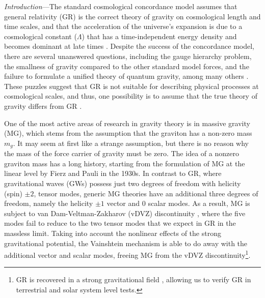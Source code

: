 \documentclass[10pt,prd,twocolumn,aps,nofootinbib,nobibnotes,superscriptaddress,preprintnumbers]{revtex4-2}
\begin{document}
\textit{Introduction}---The standard cosmological concordance model assumes that general relativity (GR) is the correct theory of gravity on cosmological length and time scales, and that the acceleration of the universe's expansion is due to a cosmological constant ($\Lambda$) that has a time-independent energy density and becomes dominant at late times \cite{Dodelson:2020bqr}. 
Despite the success of the concordance model, there are several unanswered questions, including the gauge hierarchy problem, the smallness of gravity compared to the other standard model forces, and the failure to formulate a unified theory of quantum gravity, among many others \cite{Dvali:2013qwe, Moffat:1998vi}. 
These puzzles suggest that GR is not suitable for describing physical processes at cosmological scales, and thus, one possibility is to assume that the true theory of gravity differs from GR \cite{deRham:2023byw}. 

One of the most active areas of research in gravity theory is in massive gravity (MG), which stems from the assumption that the graviton has a non-zero mass $m_g$. It may seem at first like a strange assumption, but there is no reason why the mass of the force carrier of gravity must be zero. The idea of a nonzero graviton mass has a long history, starting from the formulation of MG at the linear level by Fierz and Pauli \cite{Fierz:1939ix} in the 1930s. In contrast to GR, where gravitational waves (GWs) possess just two degrees of freedom with helicity (spin) $\pm 2$, tensor modes, generic MG theories have an additional three degrees of freedom, namely the helicity  $\pm 1$ vector and $0$ scalar modes. As a result, MG is subject to van Dam-Veltman-Zakharov (vDVZ) discontinuity \cite{vanDam:1970vg,Zakharov:1970cc}, where the five modes fail to reduce to the two tensor modes that we expect in GR in the massless limit. Taking into account the nonlinear effects of the strong gravitational potential, the Vainshtein mechanism \cite{Vainshtein:1972sx} is able to do away with the additional vector and scalar modes, freeing MG from the vDVZ discontinuity\footnote{GR is recovered in a strong gravitational field \cite{Tasinato:2013rza}, allowing us to verify GR in terrestrial and solar system level tests.}.
\end{document}

